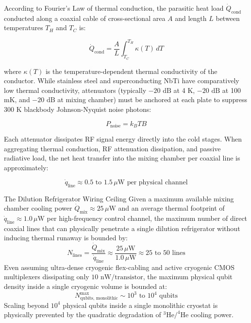 According to Fourier's Law of thermal conduction, the parasitic heat load $\dot{Q}_{\text{cond}}$ conducted along a coaxial cable of cross-sectional area $A$ and length $L$ between temperatures $T_H$ and $T_C$ is:

\begin{equation}
    \dot{Q}_{\text{cond}} = \frac{A}{L} \int_{T_C}^{T_H} \kappa(T)\,dT
\end{equation}

where $\kappa(T)$ is the temperature-dependent thermal conductivity of the conductor. While stainless steel and superconducting NbTi have comparatively low thermal conductivity, attenuators (typically $-20\text{ dB}$ at 4 K, $-20\text{ dB}$ at 100 mK, and $-20\text{ dB}$ at mixing chamber) must be anchored at each plate to suppress 300 K blackbody Johnson-Nyquist noise photons:

\begin{equation}
    P_{\text{noise}} = k_B T B
\end{equation}

Each attenuator dissipates RF signal energy directly into the cold stages. When aggregating thermal conduction, RF attenuation dissipation, and passive radiative load, the net heat transfer into the mixing chamber per coaxial line is approximately:

\begin{equation}
    \dot{q}_{\text{line}} \approx 0.5\text{ to }1.5\,\mu\text{W per physical channel}
\end{equation}

\begin{theorembox}{The Dilution Refrigerator Wiring Ceiling}
Given a maximum available mixing chamber cooling power $\dot{Q}_{\text{mix}} \approx 25\,\mu\text{W}$ and an average thermal footprint of $\dot{q}_{\text{line}} \approx 1.0\,\mu\text{W}$ per high-frequency control channel, the maximum number of direct coaxial lines that can physically penetrate a single dilution refrigerator without inducing thermal runaway is bounded by:
\begin{equation}
    N_{\text{lines}} = \frac{\dot{Q}_{\text{mix}}}{\dot{q}_{\text{line}}} \approx \frac{25\,\mu\text{W}}{1.0\,\mu\text{W}} \approx 25\text{ to }50\text{ lines}
\end{equation}
Even assuming ultra-dense cryogenic flex-cabling and active cryogenic CMOS multiplexers dissipating only $10\text{ nW/transistor}$, the maximum physical qubit density inside a single cryogenic volume is bounded at:
\begin{equation}
    N_{\text{qubits, monolithic}}^{\text{max}} \sim 10^3\text{ to }10^4\text{ qubits}
\end{equation}
Scaling beyond $10^4$ physical qubits inside a single monolithic cryostat is physically prevented by the quadratic degradation of $^3\text{He}/^4\text{He}$ cooling power.
\end{theorembox}

